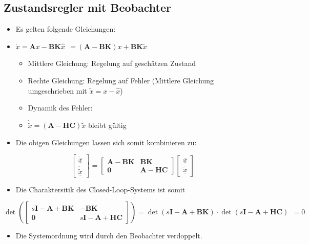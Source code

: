 \subsection{Zustandsregler mit Beobachter}
\begin{itemize}
	\item Es gelten folgende Gleichungen:
	\item []$\dot{x} =\boldsymbol{A}x-\boldsymbol{BK}\hat{x}~~ =\left(\boldsymbol{A} -\boldsymbol{BK}\right)x+\boldsymbol{BK}\tilde{x}$
	\begin{itemize}
		\item Mittlere Gleichung: Regelung auf geschätzen Zustand
		\item Rechte Gleichung: Regelung auf Fehler (Mittlere Gleichung umgeschrieben mit $\tilde{x}=x-\hat{x}$)
		\item Dynamik des Fehler:
		\item[] $\dot{\tilde{x}} = \left(\boldsymbol{A}-\boldsymbol{HC}\right)\tilde{x}$ bleibt gültig
	\end{itemize}
	\item Die obigen Gleichungen lassen sich somit kombinieren zu:
\end{itemize}
\begin{equation*}
	\begin{bmatrix}
		\underline{\dot{x}}\\
		\underline{\dot{\tilde{x}}}
	\end{bmatrix} = 
	\begin{bmatrix}
		\boldsymbol{A}-\boldsymbol{BK}	&\boldsymbol{BK}\\
		\boldsymbol{0}					&\boldsymbol{A}-\boldsymbol{HC}
	\end{bmatrix} 	\begin{bmatrix}
		\underline{x}\\
		\underline{\tilde{x}}
	\end{bmatrix} 
\end{equation*}
\begin{itemize}
	\item Die Charaktersitik des Closed-Loop-Systems ist somit
\end{itemize}
\begin{equation*}
	\det\left(\begin{bmatrix}
		s\boldsymbol{I}-\boldsymbol{A}+\boldsymbol{BK}	&-\boldsymbol{BK}\\
		\boldsymbol{0}									&s\boldsymbol{I}-\boldsymbol{A}+\boldsymbol{HC}
	\end{bmatrix}\right) = \det\left(s\boldsymbol{I}-\boldsymbol{A}+\boldsymbol{BK}\right)\cdot \det\left(s\boldsymbol{I}-\boldsymbol{A}+\boldsymbol{HC}\right) ~~= 0
\end{equation*}
\begin{itemize}
	\item Die Systemordnung wird durch den Beobachter verdoppelt.
\end{itemize}

